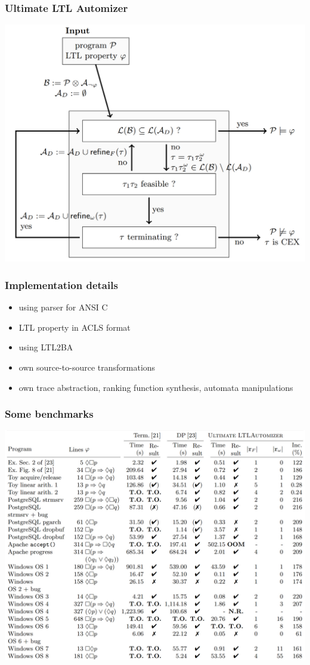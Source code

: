 \documentclass[xcolor=dvipsnames]{beamer}
\begin{document}
\begin{frame}
	\frametitle{Ultimate LTL Automizer}
    \includegraphics[width=\textwidth,height=0.9\textheight,keepaspectratio]{ltlultimate.jpg}
\end{frame}

\begin{frame}
	\frametitle{Implementation details}
    \begin{itemize}[<+->]
        \item using parser for ANSI C
        \item LTL property in ACLS format
        \item using LTL2BA
        \item own source-to-source transformations
        \item own trace abstraction, ranking function synthesis, automata manipulations
    \end{itemize}
\end{frame}

\begin{frame}
	\frametitle{Some benchmarks}
    \includegraphics[width=\textwidth,height=0.9\textheight,keepaspectratio]{table-big.jpg}
\end{frame}
\end{document}
